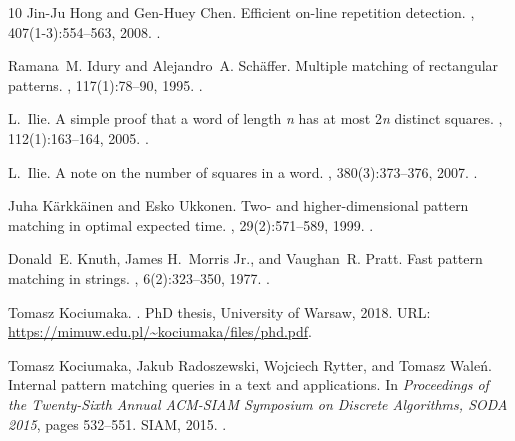 \documentclass[11pt,letterpaper]{article}
\begin{document}
\begin{thebibliography}{10}
Jin{-}Ju Hong and Gen{-}Huey Chen.
\newblock Efficient on-line repetition detection.
, 407(1-3):554--563, 2008.
\newblock \href {https://doi.org/10.1016/j.tcs.2008.08.038}
  {}.

Ramana~M. Idury and Alejandro~A. Sch{\"{a}}ffer.
\newblock Multiple matching of rectangular patterns.
, 117(1):78--90, 1995.
\newblock \href {https://doi.org/10.1006/INCO.1995.1030}
  {}.

L.~Ilie.
\newblock A simple proof that a word of length \emph{n} has at most 2\emph{n}
  distinct squares.
, 112(1):163--164,
  2005.
\newblock \href {https://doi.org/10.1016/J.JCTA.2005.01.006}
  {}.

L.~Ilie.
\newblock A note on the number of squares in a word.
, 380(3):373--376, 2007.
\newblock \href {https://doi.org/10.1016/J.TCS.2007.03.025}
  {}.

Juha K{\"{a}}rkk{\"{a}}inen and Esko Ukkonen.
\newblock Two- and higher-dimensional pattern matching in optimal expected
  time.
, 29(2):571--589, 1999.
\newblock \href {https://doi.org/10.1137/S0097539794275872}
  {}.

Donald~E. Knuth, James H.~Morris Jr., and Vaughan~R. Pratt.
\newblock Fast pattern matching in strings.
, 6(2):323--350, 1977.
\newblock \href {https://doi.org/10.1137/0206024} {}.

Tomasz Kociumaka.
.
\newblock PhD thesis, University of Warsaw, 2018.
\newblock URL: \url{https://mimuw.edu.pl/~kociumaka/files/phd.pdf}.

Tomasz Kociumaka, Jakub Radoszewski, Wojciech Rytter, and Tomasz Wale\'n.
\newblock Internal pattern matching queries in a text and applications.
\newblock In {\em Proceedings of the Twenty-Sixth Annual {ACM-SIAM} Symposium
  on Discrete Algorithms, {SODA} 2015}, pages 532--551. {SIAM}, 2015.
\newblock \href {https://doi.org/10.1137/1.9781611973730.36}
  {}.


\end{thebibliography}
\end{document}
